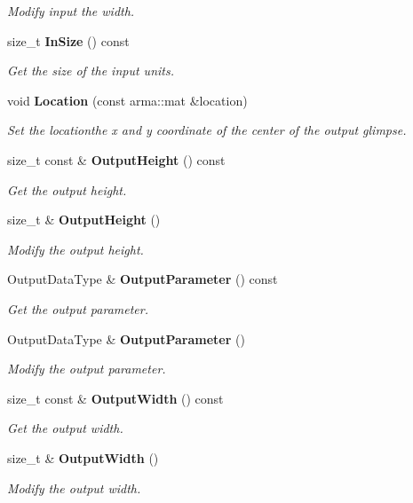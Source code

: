\begin{DoxyCompactItemize}
\begin{DoxyCompactList}\small\item\em Modify input the width. \end{DoxyCompactList}\item 
size\+\_\+t \textbf{ In\+Size} () const
\begin{DoxyCompactList}\small\item\em Get the size of the input units. \end{DoxyCompactList}\item 
void \textbf{ Location} (const arma\+::mat \&location)
\begin{DoxyCompactList}\small\item\em Set the locationthe x and y coordinate of the center of the output glimpse. \end{DoxyCompactList}\item 
size\+\_\+t const  \& \textbf{ Output\+Height} () const
\begin{DoxyCompactList}\small\item\em Get the output height. \end{DoxyCompactList}\item 
size\+\_\+t \& \textbf{ Output\+Height} ()
\begin{DoxyCompactList}\small\item\em Modify the output height. \end{DoxyCompactList}\item 
Output\+Data\+Type \& \textbf{ Output\+Parameter} () const
\begin{DoxyCompactList}\small\item\em Get the output parameter. \end{DoxyCompactList}\item 
Output\+Data\+Type \& \textbf{ Output\+Parameter} ()
\begin{DoxyCompactList}\small\item\em Modify the output parameter. \end{DoxyCompactList}\item 
size\+\_\+t const  \& \textbf{ Output\+Width} () const
\begin{DoxyCompactList}\small\item\em Get the output width. \end{DoxyCompactList}\item 
size\+\_\+t \& \textbf{ Output\+Width} ()
\begin{DoxyCompactList}\small\item\em Modify the output width. \end{DoxyCompactList}\item 

\end{DoxyCompactItemize}
